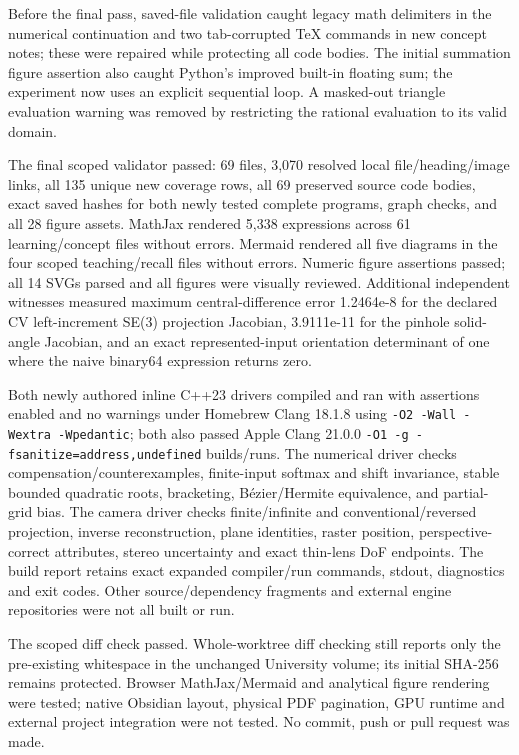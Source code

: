Before the final pass, saved-file validation caught legacy math delimiters in the numerical continuation and two tab-corrupted TeX commands in new concept notes; these were repaired while protecting all code bodies. The initial summation figure assertion also caught Python's improved built-in floating sum; the experiment now uses an explicit sequential loop. A masked-out triangle evaluation warning was removed by restricting the rational evaluation to its valid domain.

The final scoped validator passed: 69 files, 3,070 resolved local file/heading/image links, all 135 unique new coverage rows, all 69 preserved source code bodies, exact saved hashes for both newly tested complete programs, graph checks, and all 28 figure assets. MathJax rendered 5,338 expressions across 61 learning/concept files without errors. Mermaid rendered all five diagrams in the four scoped teaching/recall files without errors. Numeric figure assertions passed; all 14 SVGs parsed and all figures were visually reviewed. Additional independent witnesses measured maximum central-difference error 1.2464e-8 for the declared CV left-increment SE(3) projection Jacobian, 3.9111e-11 for the pinhole solid-angle Jacobian, and an exact represented-input orientation determinant of one where the naive binary64 expression returns zero.

Both newly authored inline C++23 drivers compiled and ran with assertions enabled and no warnings under Homebrew Clang 18.1.8 using \texttt{-O2\ -Wall\ -Wextra\ -Wpedantic}; both also passed Apple Clang 21.0.0 \texttt{-O1\ -g\ -fsanitize=address,undefined} builds/runs. The numerical driver checks compensation/counterexamples, finite-input softmax and shift invariance, stable bounded quadratic roots, bracketing, Bézier/Hermite equivalence, and partial-grid bias. The camera driver checks finite/infinite and conventional/reversed projection, inverse reconstruction, plane identities, raster position, perspective-correct attributes, stereo uncertainty and exact thin-lens DoF endpoints. The build report retains exact expanded compiler/run commands, stdout, diagnostics and exit codes. Other source/dependency fragments and external engine repositories were not all built or run.

The scoped diff check passed. Whole-worktree diff checking still reports only the pre-existing whitespace in the unchanged University volume; its initial SHA-256 remains protected. Browser MathJax/Mermaid and analytical figure rendering were tested; native Obsidian layout, physical PDF pagination, GPU runtime and external project integration were not tested. No commit, push or pull request was made.

